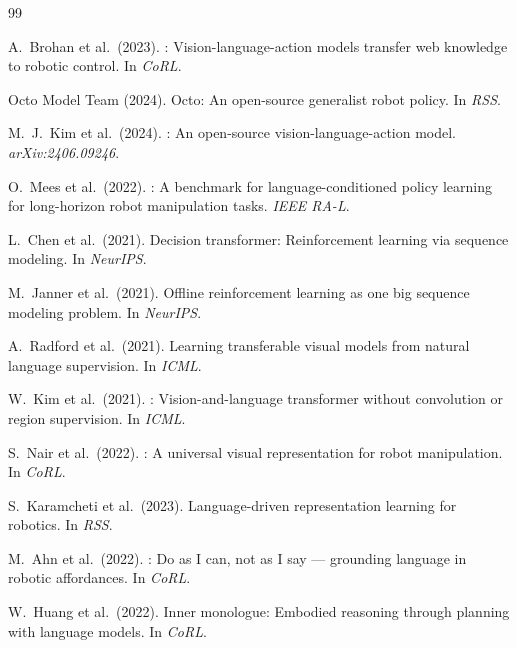 \documentclass{article}
\begin{document}

\begin{thebibliography}{99}

A.~Brohan et al.\ (2023).
: Vision-language-action models transfer web knowledge to robotic control.
\newblock In \textit{CoRL}.

{Octo Model Team} (2024).
\newblock Octo: An open-source generalist robot policy.
\newblock In \textit{RSS}.

M.~J.~Kim et al.\ (2024).
: An open-source vision-language-action model.
\newblock \textit{arXiv:2406.09246}.

O.~Mees et al.\ (2022).
: A benchmark for language-conditioned policy learning for long-horizon
robot manipulation tasks.
\newblock \textit{IEEE RA-L}.

L.~Chen et al.\ (2021).
\newblock Decision transformer: Reinforcement learning via sequence modeling.
\newblock In \textit{NeurIPS}.

M.~Janner et al.\ (2021).
\newblock Offline reinforcement learning as one big sequence modeling problem.
\newblock In \textit{NeurIPS}.

A.~Radford et al.\ (2021).
\newblock Learning transferable visual models from natural language supervision.
\newblock In \textit{ICML}.

W.~Kim et al.\ (2021).
: Vision-and-language transformer without convolution or region supervision.
\newblock In \textit{ICML}.

S.~Nair et al.\ (2022).
: A universal visual representation for robot manipulation.
\newblock In \textit{CoRL}.

S.~Karamcheti et al.\ (2023).
\newblock Language-driven representation learning for robotics.
\newblock In \textit{RSS}.

M.~Ahn et al.\ (2022).
: Do as I can, not as I say --- grounding language in robotic affordances.
\newblock In \textit{CoRL}.

W.~Huang et al.\ (2022).
\newblock Inner monologue: Embodied reasoning through planning with language models.
\newblock In \textit{CoRL}.

\end{thebibliography}
\end{document}
